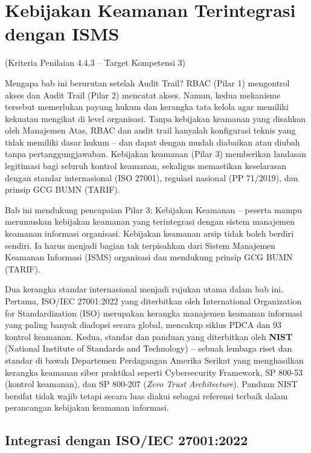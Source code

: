 \documentclass[12pt,a4paper]{report}
\begin{document}
\chapter{Kebijakan Keamanan Terintegrasi dengan ISMS}
(Kriteria Penilaian 4.4.3 -- Target Kompetensi 3)

Mengapa bab ini berurutan setelah Audit Trail? RBAC (Pilar 1) mengontrol akses dan Audit Trail (Pilar 2) mencatat akses. Namun, kedua mekanisme tersebut memerlukan payung hukum dan kerangka tata kelola agar memiliki kekuatan mengikat di level organisasi. Tanpa kebijakan keamanan yang disahkan oleh Manajemen Atas, RBAC dan audit trail hanyalah konfigurasi teknis yang tidak memiliki dasar hukum -- dan dapat dengan mudah diabaikan atau diubah tanpa pertanggungjawaban. Kebijakan keamanan (Pilar 3) memberikan landasan legitimasi bagi seluruh kontrol keamanan, sekaligus memastikan keselarasan dengan standar internasional (ISO 27001), regulasi nasional (PP 71/2019), dan prinsip GCG BUMN (TARIF).

Bab ini mendukung pencapaian Pilar 3: Kebijakan Keamanan -- peserta mampu merumuskan kebijakan keamanan yang terintegrasi dengan sistem manajemen keamanan informasi organisasi. Kebijakan keamanan arsip tidak boleh berdiri sendiri. Ia harus menjadi bagian tak terpisahkan dari Sistem Manajemen Keamanan Informasi (ISMS) organisasi dan mendukung prinsip GCG BUMN (TARIF).

Dua kerangka standar internasional menjadi rujukan utama dalam bab ini. Pertama, ISO/IEC 27001:2022 yang diterbitkan oleh International Organization for Standardization (ISO) merupakan kerangka manajemen keamanan informasi yang paling banyak diadopsi secara global, mencakup siklus PDCA dan 93 kontrol keamanan. Kedua, standar dan panduan yang diterbitkan oleh \textbf{NIST} (National Institute of Standards and Technology) -- sebuah lembaga riset dan standar di bawah Departemen Perdagangan Amerika Serikat yang menghasilkan kerangka keamanan siber praktikal seperti Cybersecurity Framework, SP 800-53 (kontrol keamanan), dan SP 800-207 (\textit{Zero Trust Architecture}). Panduan NIST bersifat tidak wajib tetapi secara luas diakui sebagai referensi terbaik dalam perancangan kebijakan keamanan informasi.

\section{Integrasi dengan ISO/IEC 27001:2022}
\end{document}
